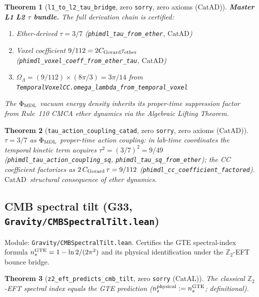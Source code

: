 \documentclass[11pt,a4paper]{article}
\newtheorem{theorem}{Theorem}[section]
\theoremstyle{definition}
\newcommand{\CatAL}{\ensuremath{\mathrm{CatAL}}}
\newcommand{\CatAD}{\ensuremath{\mathrm{CatAD}}}
\begin{document}
\begin{theorem}[\lstinline|l1_to_l2_tau_bridge|, zero \texttt{sorry}, zero axioms ($\CatAD$)]
\label{thm:l1-l2-tau-bridge}
\textbf{Master L1\,\textrightarrow\,L2 $\tau$ bundle.}  The full derivation chain is certified:
\begin{enumerate}
  \item Ether-derived $\tau = 3/7$ (\lstinline|phimdl_tau_from_ether|, \CatAD)
  \item Voxel coefficient $9/112 = 2C_{\rm Gorard}\tau_{\rm ether}$ (\lstinline|phimdl_voxel_coeff_from_ether_tau|, \CatAD)
  \item $\Omega_\Lambda = (9/112)\times(8\pi/3) = 3\pi/14$ from \lstinline|TemporalVoxelCC.omega_lambda_from_temporal_voxel|
\end{enumerate}
The $\Phi_{\rm MDL}$ vacuum energy density inherits its proper-time suppression factor from
Rule~110 CMCA ether dynamics via the Algebraic Lifting Theorem.
\end{theorem}

\begin{theorem}[\lstinline|tau_action_coupling_catad|, zero \texttt{sorry}, zero axioms ($\CatAD$)]
\label{thm:tau-action-coupling-catad}
$\tau=3/7$ as $\Phi_{\rm MDL}$ proper-time action coupling: in lab-time coordinates the
temporal kinetic term acquires $\tau^2 = (3/7)^2 = 9/49$
(\lstinline|phimdl_tau_action_coupling_sq|,
\lstinline|phimdl_tau_sq_from_ether|); the CC coefficient factorizes as
$2\,C_{\rm Gorard}\,\tau = 9/112$
(\lstinline|phimdl_cc_coefficient_factored|).  \CatAD\ structural consequence of ether dynamics.
\end{theorem}

\subsection{CMB spectral tilt (G33,
  \texttt{Gravity/CMBSpectralTilt.lean})}\label{subsec:cmb-spectral-tilt-g33}

Module: \texttt{Gravity/CMBSpectralTilt.lean}.  Certifies the GTE spectral-index
formula $n_s^{\rm GTE}=1-\ln 2/(2\pi^2)$ and its physical identification under
the $\mathbb{Z}_2$-EFT bounce bridge.

\begin{theorem}[\lstinline|z2_eft_predicts_cmb_tilt|, zero \texttt{sorry} ($\CatAL$)]
The classical $\mathbb{Z}_2$-EFT spectral index equals the GTE prediction
($n_s^{\rm physical} := n_s^{\rm GTE}$; definitional).
\end{theorem}
\end{document}

